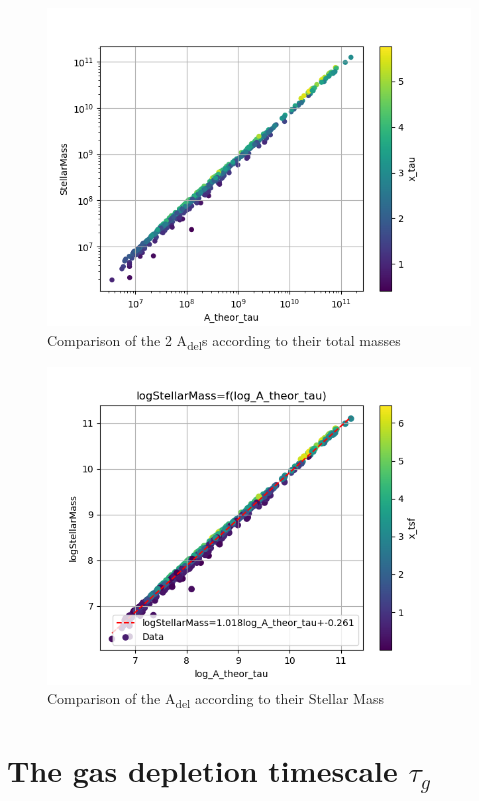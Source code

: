 \documentclass[a4paper,twocolumn]{article}
\begin{document}
\begin{figure}[!htpb]
\centering
\includegraphics[width=.9\linewidth]{./figs/A_theor_tau-M*.png}
\caption{\label{fig:Comparison of the 2 A_{del}s according to their total masses}Comparison of the 2 A\textsubscript{del}s according to their total masses}
\end{figure}

\begin{figure}[!htpb]
\centering
\includegraphics[width=.9\linewidth]{./figs/log_A_theor_tau-logStellarMass-color_x_tsf.png}
\caption{\label{fig:Comparison of the A_del according to their Stellar Mass}Comparison of the A\textsubscript{del} according to their Stellar Mass}
\end{figure}



\section{The gas depletion timescale \(\tau_g\) \label{SEC:tau_g}}
\label{sec:org325e6be}
\end{document}
